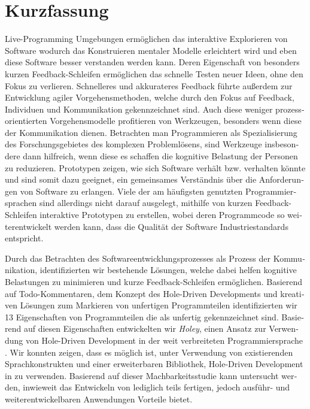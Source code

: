 \chapter{Kurzfassung}

\begin{german} %
    Live-Programming Umgebungen ermöglichen das interaktive Explorieren von Software wodurch das Konstruieren mentaler Modelle erleichtert wird und eben diese Software besser verstanden werden kann.
    Deren Eigenschaft von besonders kurzen Feedback-Schleifen ermöglichen das schnelle Testen neuer Ideen, ohne den Fokus zu verlieren.
    Schnelleres und akkurateres Feedback führte außerdem zur Entwicklung agiler Vorgehensmethoden, welche durch den Fokus auf Feedback, Individuen und Kommunikation gekennzeichnet sind.
    Auch diese weniger prozessorientierten Vorgehensmodelle profitieren von Werkzeugen, besonders wenn diese der Kommunikation dienen.
    Betrachten man Programmieren als Spezialisierung des Forschungsgebietes des komplexen Problemlösens, sind Werkzeuge insbesondere dann hilfreich, wenn diese es schaffen die kognitive Belastung der Personen zu reduzieren.
    Prototypen zeigen, wie sich Software verhält bzw. verhalten könnte und sind somit dazu geeignet, ein gemeinsames Verständnis über die Anforderungen von Software zu erlangen.
    Viele der am häufigsten genutzten Programmiersprachen sind allerdings nicht darauf ausgelegt, mithilfe von kurzen Feedback-Schleifen interaktive Prototypen zu erstellen, wobei deren Programmcode so weiterentwickelt werden kann, dass die Qualität der Software Industriestandards entspricht.

    Durch das Betrachten des Softwareentwicklungsprozesses als Prozess der Kommunikation, identifizierten wir bestehende Lösungen, welche dabei helfen kognitive Belastungen zu minimieren und kurze Feedback-Schleifen ermöglichen.
    Basierend auf Todo-Kommentaren, dem Konzept des Hole-Driven Developments und kreativen Lösungen zum Markieren von unfertigen Programmteilen identifizierten wir 13 Eigenschaften von Programmteilen die als unfertig gekennzeichnet sind.
    Basierend auf diesen Eigenschaften entwickelten wir \emph{Holey}, einen Ansatz zur Verwendung von Hole-Driven Development in der weit verbreiteten Programmiersprache \CS.
    Wir konnten zeigen, dass es möglich ist, unter Verwendung von existierenden Sprachkonstrukten und einer erweiterbaren Bibliothek, Hole-Driven Development in \CS zu verwenden.
    Basierend auf dieser Machbarkeitsstudie kann untersucht werden, inwieweit das Entwickeln von lediglich teils fertigen, jedoch ausführ- und weiterentwickelbaren Anwendungen Vorteile bietet.
\end{german}